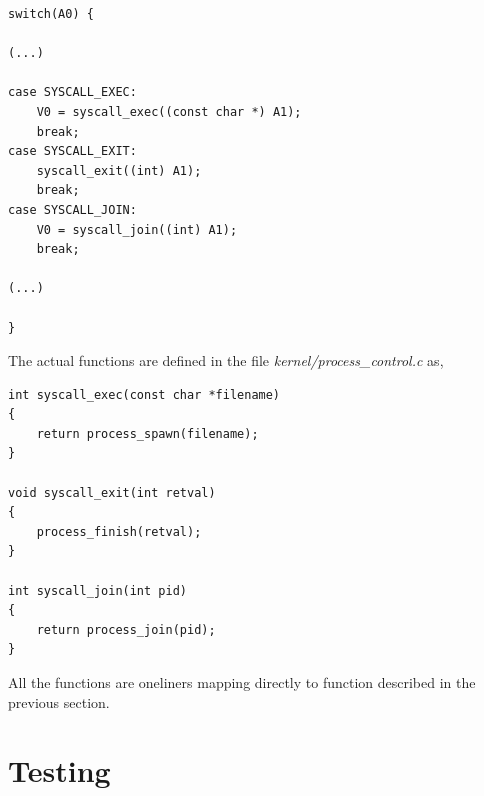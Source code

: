 \documentclass[11pt]{article}
\begin{document}
    \begin{lstlisting}[style=customc]
switch(A0) {

(...)

case SYSCALL_EXEC:
    V0 = syscall_exec((const char *) A1);
    break;
case SYSCALL_EXIT:
    syscall_exit((int) A1);
    break;
case SYSCALL_JOIN:
    V0 = syscall_join((int) A1);
    break;

(...)

}
    \end{lstlisting}

    The actual functions are defined in the file
    \textit{kernel/process\_control.c} as,

    \begin{lstlisting}[style=customc]
int syscall_exec(const char *filename)
{
    return process_spawn(filename);
}

void syscall_exit(int retval)
{
    process_finish(retval);
}

int syscall_join(int pid)
{
    return process_join(pid);
}
    \end{lstlisting}

    All the functions are oneliners mapping directly to function described in
    the previous section.

    \section{Testing}
\end{document}
